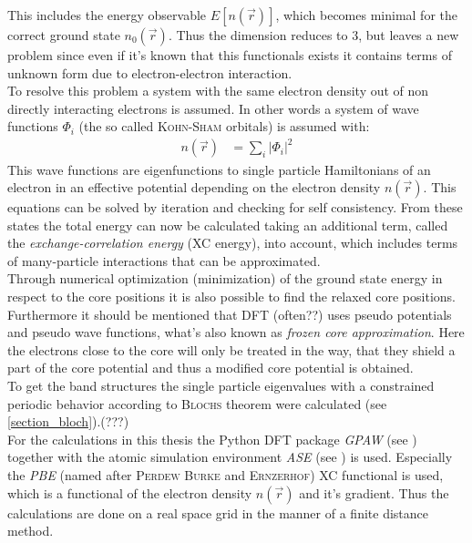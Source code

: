 This includes the energy observable $E[n\left(\vec{r}\right)]$, which becomes minimal for the correct ground state $n_0\left(\vec{r}\right)$. Thus the dimension reduces to $3$, but leaves a new problem since even if it's known that this functionals exists it contains terms of unknown form due to electron-electron interaction.\\
To resolve this problem a system with the same electron density out of non directly interacting electrons is assumed. In other words a system of wave functions $\varPhi_i$ (the so called \textsc{Kohn-Sham} orbitals) is assumed with:
\begin{align}
n\left(\vec{r}\right) &= \sum_i \left|\varPhi_i\right|^2
\end{align}
This wave functions are eigenfunctions to single particle Hamiltonians of an electron in an effective potential depending on the electron density $n(\vec{r})$. This equations can be solved by iteration and checking for self consistency. From these states the total energy can now be calculated taking an additional term, called the \emph{exchange-correlation energy} (XC energy), into account, which includes terms of many-particle interactions that can be approximated.\\
Through numerical optimization (minimization) of the ground state energy in respect to the core positions it is also possible to find the relaxed core positions.\\
Furthermore it should be mentioned that DFT (often??) uses pseudo potentials and pseudo wave functions, what's also known as \emph{frozen core approximation}. Here the electrons close to the core will only be treated in the way, that they shield a part of the core potential and thus a modified core potential is obtained.\\
To get the band structures the single particle eigenvalues with a constrained periodic behavior according to \textsc{Blochs} theorem were calculated (see \cref{section_bloch}).(???)\\
For the calculations in this thesis the Python DFT package \emph{GPAW} (see \cite{GPAW1, GPAW2}) together with the atomic simulation environment \emph{ASE} (see \cite{ASE}) is used.
Especially the \emph{PBE} (named after \textsc{Perdew Burke} and \mbox{\textsc{Ernzerhof}}) XC functional is used, which is a functional of the electron density $n\left(\vec{r}\right)$  and it's gradient. Thus the calculations are done on a real space grid in the manner of a finite distance method.

